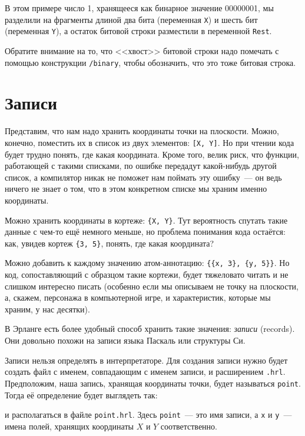 \documentclass[
  paper=a4,
  fontsize=14pt,
  openany,
  appendixprefix=true
]{scrbook}
\begin{document}
В этом примере число 1, хранящееся как бинарное значение 00000001, мы разделили на фрагменты длиной два бита (переменная \lstinline{X}) и шесть бит (переменная \lstinline{Y}), а остаток битовой строки разместили в переменной \lstinline{Rest}.

Обратите внимание на то, что <<хвост>> битовой строки надо помечать с помощью конструкции \lstinline{/binary}, чтобы обозначить, что это тоже битовая строка.

\section{Записи}

Представим, что нам надо хранить координаты точки на плоскости. Можно, конечно, поместить их в список из двух элементов: \lstinline{[X, Y]}. Но при чтении кода будет трудно понять, где какая координата. Кроме того, велик риск, что функции, работающей с такими списками, по ошибке передадут какой-нибудь другой список, а компилятор никак не поможет нам поймать эту ошибку~--- он ведь ничего не знает о том, что в этом конкретном списке мы храним именно координаты.

Можно хранить координаты в кортеже: \lstinline!{X, Y}!. Тут вероятность спутать такие данные с чем-то ещё немного меньше, но проблема понимания кода остаётся: как, увидев кортеж  \lstinline!{3, 5}!, понять, где какая координата?

Можно добавить к каждому значению атом-аннотацию: \lstinline!{{x, 3}, {y, 5}}!. Но код, сопоставляющий с образцом такие кортежи, будет тяжеловато читать и не слишком интересно писать (особенно если мы описываем не точку на плоскости, а, скажем, персонажа в компьютерной игре, и характеристик, которые мы храним, у нас десятки).

В Эрланге есть более удобный способ хранить такие значения: {\em записи} (records). Они довольно похожи на записи языка Паскаль или структуры Си.

Записи нельзя определять в интерпретаторе. Для создания записи нужно будет создать файл с именем, совпадающим с именем записи, и расширением \lstinline{.hrl}. Предположим, наша запись, хранящая координаты точки, будет называться \lstinline{point}. Тогда её определение будет выглядеть так:

и располагаться в файле \lstinline{point.hrl}. Здесь \lstinline{point}~--- это имя записи, а \lstinline{x} и \lstinline{y}~--- имена полей, хранящих координаты $X$ и $Y$ соответственно.
\end{document}
